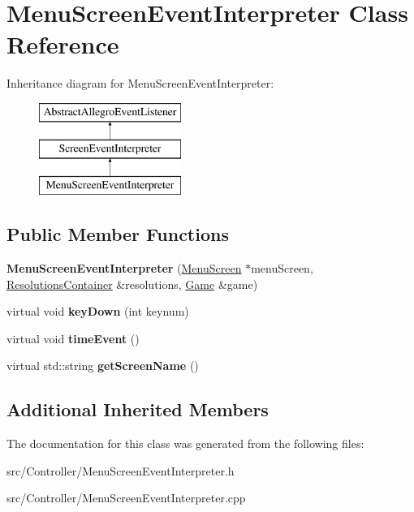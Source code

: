 \hypertarget{classMenuScreenEventInterpreter}{}\section{Menu\+Screen\+Event\+Interpreter Class Reference}
\label{classMenuScreenEventInterpreter}
Inheritance diagram for Menu\+Screen\+Event\+Interpreter\+:\begin{figure}[H]
\begin{center}
\leavevmode
\includegraphics[height=3.000000cm]{classMenuScreenEventInterpreter}
\end{center}
\end{figure}
\subsection*{Public Member Functions}
\begin{DoxyCompactItemize}
\item 
{\bfseries Menu\+Screen\+Event\+Interpreter} (\hyperlink{classMenuScreen}{Menu\+Screen} $\ast$menu\+Screen, \hyperlink{classResolutionsContainer}{Resolutions\+Container} \&resolutions, \hyperlink{classGame}{Game} \&game)\hypertarget{classMenuScreenEventInterpreter_a9921d7a2a07ac47aba2bd7a9e818c3fe}{}\label{classMenuScreenEventInterpreter_a9921d7a2a07ac47aba2bd7a9e818c3fe}

\item 
virtual void {\bfseries key\+Down} (int keynum)\hypertarget{classMenuScreenEventInterpreter_ad7c59c5f36a98003c6ad76f1807faa78}{}\label{classMenuScreenEventInterpreter_ad7c59c5f36a98003c6ad76f1807faa78}

\item 
virtual void {\bfseries time\+Event} ()\hypertarget{classMenuScreenEventInterpreter_aa2d6e95386c776ddaf7347d3d594226a}{}\label{classMenuScreenEventInterpreter_aa2d6e95386c776ddaf7347d3d594226a}

\item 
virtual std\+::string {\bfseries get\+Screen\+Name} ()\hypertarget{classMenuScreenEventInterpreter_a6553e272ab826842327c5ae054fae90a}{}\label{classMenuScreenEventInterpreter_a6553e272ab826842327c5ae054fae90a}

\end{DoxyCompactItemize}
\subsection*{Additional Inherited Members}


The documentation for this class was generated from the following files\+:\begin{DoxyCompactItemize}
\item 
src/\+Controller/Menu\+Screen\+Event\+Interpreter.\+h\item 
src/\+Controller/Menu\+Screen\+Event\+Interpreter.\+cpp\end{DoxyCompactItemize}
